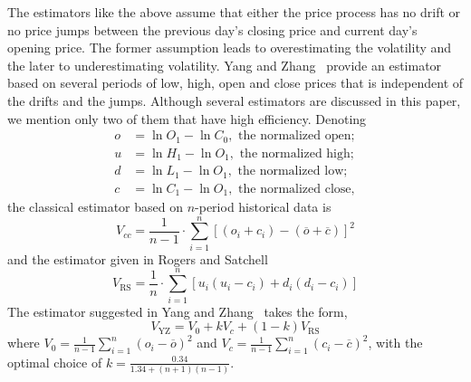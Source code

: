 The estimators like the above assume that either the price process has no drift or no price jumps between the previous day's closing price and current day's opening price. The former assumption leads to overestimating the volatility and the later to underestimating volatility. Yang and Zhang~\cite{yangzhang2000} provide an estimator based on several periods of low, high, open and close prices that is independent of the drifts and the jumps. Although several estimators are discussed in this paper, we mention only two of them that have high efficiency. Denoting
	\[
	\begin{split}
	o&= \ln O_1 - \ln C_0, \text{ the normalized open}; \\
	u&= \ln H_1 - \ln O_1, \text{ the normalized high}; \\
	d&= \ln L_1 - \ln O_1, \text{ the normalized low}; \\
	c&= \ln C_1 - \ln O_1,  \text{ the normalized close},
	\end{split}
	\]
the classical estimator based on $n$-period historical data is
	\begin{equation} \label{eqn:nperioddata}
	V_{cc}= \dfrac{1}{n-1} \cdot \sum_{i=1}^n [(o_i + c_i) - (\overline{o} + \overline{c})]^2
	\end{equation}
and the estimator given in Rogers and Satchell~\cite{rogerssatchell1991}
	\begin{equation} \label{eqn:rogerssatchell}
	V_{\text{RS}}= \dfrac{1}{n} \cdot \sum_{i=1}^n [u_i(u_i - c_i) + d_i(d_i-c_i)]
	\end{equation}
The estimator suggested in Yang and Zhang~\cite{yangzhang2000} takes the form,
	\begin{equation} \label{eqn:yang2000}
	V_{\text{YZ}}= V_0 + k V_c + (1-k)V_{\text{RS}}
	\end{equation}
where $V_0= \frac{1}{n-1} \sum_{i=1}^n (o_i - \overline{o})^2$ and $V_c= \frac{1}{n-1} \sum_{i=1}^n (c_i - \overline{c})^2$, with the optimal choice of $k= \frac{0.34}{1.34 + (n+1)(n-1)}$. \\


